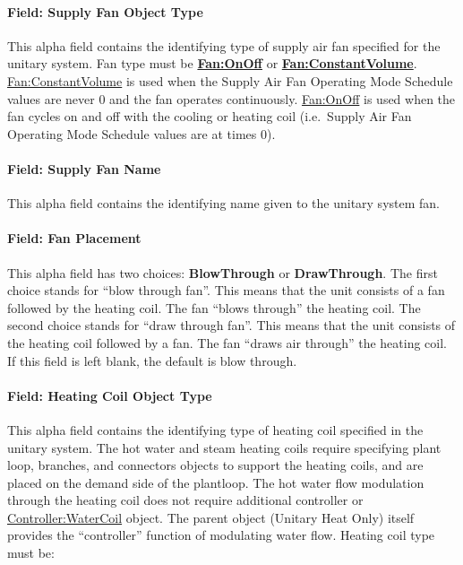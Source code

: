 \paragraph{Field: Supply Fan Object Type}\label{field-supply-fan-object-type-4}

This alpha field contains the identifying type of supply air fan specified for the unitary system. Fan type must be \textbf{\hyperref[fanonoff]{Fan:OnOff}} or \textbf{\hyperref[fanconstantvolume]{Fan:ConstantVolume}}. \hyperref[fanconstantvolume]{Fan:ConstantVolume} is used when the Supply Air Fan Operating Mode Schedule values are never 0 and the fan operates continuously. \hyperref[fanonoff]{Fan:OnOff} is used when the fan cycles on and off with the cooling or heating coil (i.e.~Supply Air Fan Operating Mode Schedule values are at times 0).

\paragraph{Field: Supply Fan Name}\label{field-supply-fan-name-4}

This alpha field contains the identifying name given to the unitary system fan.

\paragraph{Field: Fan Placement}\label{field-fan-placement-5}

This alpha field has two choices: \textbf{BlowThrough} or \textbf{DrawThrough}. The first choice stands for ``blow through fan''. This means that the unit consists of a fan followed by the heating coil. The fan ``blows through'' the heating coil. The second choice stands for ``draw through fan''. This means that the unit consists of the heating coil followed by a fan. The fan ``draws air through'' the heating coil. If this field is left blank, the default is blow through.

\paragraph{Field: Heating Coil Object Type}\label{field-heating-coil-object-type-6}

This alpha field contains the identifying type of heating coil specified in the unitary system. The hot water and steam heating coils require specifying plant loop, branches, and connectors objects to support the heating coils, and are placed on the demand side of the plantloop. The hot water flow modulation through the heating coil does not require additional controller or \hyperref[controllerwatercoil]{Controller:WaterCoil} object. The parent object (Unitary Heat Only) itself provides the ``controller'' function of modulating water flow. Heating coil type must be:

